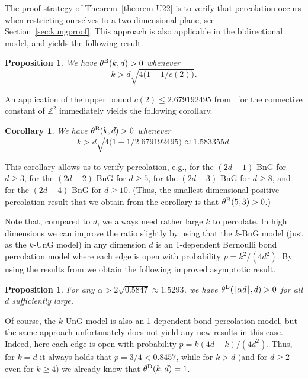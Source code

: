 \documentclass[a4paper, oneside, 11pt]{amsart}
\newtheorem{corollary}[theorem]{Corollary}
\newtheorem{prop}[theorem]{Proposition}
\theoremstyle{definition}
\newcommand{\1}{\mathbbm{1}}
\newcommand{\0}{\mathbf{o}}
\newcommand{\Z}{\mathbb{Z}}
\newcommand*{\be}{\begin{equation}}
\newcommand*{\ee}{\end{equation}}
\numberwithin{equation}{section}
\begin{document}
The proof strategy of Theorem~\ref{theorem-U22} is to verify that percolation occurs when restricting ourselves to a two-dimensional plane, see Section~\ref{sec:kungproof}. This approach is also applicable in the bidirectional model, and yields the following result.

\begin{prop}\label{prop-Bperc}
We have $\theta^{\rm B}(k,d) > 0$ whenever 
\be 
 k>d\sqrt{4\Big(1-1/c(2)\Big)}.
\ee 
\end{prop}

An application of the upper bound $c(2)\leq 2.679192495$ from~\cite{PonTitt00} for the connective constant of $\Z^2$ immediately yields the following corollary. 
\begin{corollary}\label{cor-Bperc}
We have $\theta^{\rm B}(k,d) > 0$ whenever 
\be 
 k>d\sqrt{4\Big(1-1/2.679192495\Big)}\approx 1.583355
d.
\ee 
\end{corollary}

This corollary allows us to verify percolation, e.g., for the $(2d-1)$-BnG for $d \geq 3$, for the $(2d-2)$-BnG for $d \geq 5$, for the $(2d-3)$-BnG for $d \geq 8$, and for the $(2d-4)$-BnG for $d \geq 10$. (Thus, the smallest-dimensional positive percolation result that we obtain from the corollary is that $\theta^{\rm B}(5,3) >0$.)

Note that, compared to $d$, we always need rather large $k$ to percolate. In high dimensions we can improve the ratio slightly by using that the $k$-BnG model (just as the $k$-UnG model) in any dimension $d$ is an 1-dependent Bernoulli bond percolation model where each edge is open with probability $p=k^2/(4d^2)$. By using the results from \cite{improvedLB} we obtain the following improved asymptotic result. 

\begin{prop}\label{prop-1indep}
For any $\alpha > 2 \sqrt{0.5847} \approx 1.5293$, we have $\theta^{\rm B}(\lfloor \alpha d \rfloor, d)>0$ for all $d$ sufficiently large.
\end{prop}

Of course, the $k$-UnG model is also an 1-dependent bond-percolation model, but the same approach unfortunately does not yield any new results in this case. Indeed, here each edge is open with probability $p=k(4d-k)/(4d^2)$. Thus, for $k=d$ it always holds that $p=3/4<0.8457$, while for $k>d$ (and for $d \geq 2$ even for $k \geq 4$) we already know that $\theta^{\rm D}(k,d)=1$. 
\end{document}
